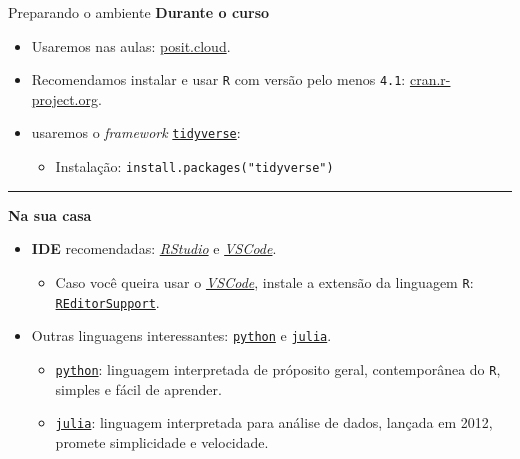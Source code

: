 \documentclass[
  10pt,
  ignorenonframetext,
]{beamer}
\providecommand{\tightlist}{%
  \setlength{\itemsep}{0pt}\setlength{\parskip}{0pt}}\usepackage{longtable,booktabs,array}
\begin{document}
\begin{frame}[fragile]{Preparando o ambiente}
\protect\hypertarget{preparando-o-ambiente}{}
\textbf{\large Durante o curso}

\begin{itemize}
\tightlist
\item
  Usaremos nas aulas: \href{https://posit.cloud/}{posit.cloud}.
\item
  Recomendamos instalar e usar \texttt{R} com versão pelo menos
  \texttt{4.1}: \href{https://cran.r-project.org}{cran.r-project.org}.
\item
  usaremos o \emph{framework}
  \href{https://www.tidyverse.org}{\texttt{tidyverse}}:

  \begin{itemize}
  \tightlist
  \item
    Instalação: \texttt{install.packages("tidyverse")}
  \end{itemize}
\end{itemize}

\rule{\textwidth}{0.5pt}

\textbf{\large Na sua casa}

\begin{itemize}
\tightlist
\item
  \textbf{IDE} recomendadas:
  \href{https://www.rstudio.com/products/rstudio/download/preview/}{\emph{RStudio}}
  e \href{https://code.visualstudio.com}{\emph{VSCode}}.

  \begin{itemize}
  \tightlist
  \item
    Caso você queira usar o
    \href{https://code.visualstudio.com}{\emph{VSCode}}, instale a
    extensão da linguagem \texttt{R}:
    \href{https://marketplace.visualstudio.com/items?itemName=REditorSupport.r}{\texttt{REditorSupport}}.
  \end{itemize}
\item
  Outras linguagens interessantes:
  \href{https://www.python.org}{\texttt{python}} e
  \href{https://julialang.org}{\texttt{julia}}.

  \begin{itemize}
  \tightlist
  \item
    \href{https://www.python.org}{\texttt{python}}: linguagem
    interpretada de próposito geral, contemporânea do \texttt{R},
    simples e fácil de aprender.
  \item
    \href{https://julialang.org}{\texttt{julia}}: linguagem interpretada
    para análise de dados, lançada em 2012, promete simplicidade e
    velocidade.
  \end{itemize}
\end{itemize}
\end{frame}
\end{document}
